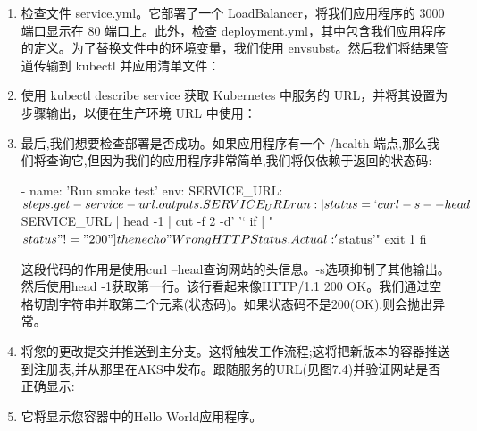 \begin{enumerate}
\item 
检查文件 service.yml。它部署了一个 LoadBalancer，将我们应用程序的 3000 端口显示在 80 端口上。此外，检查 deployment.yml，其中包含我们应用程序的定义。为了替换文件中的环境变量，我们使用 envsubst。然后我们将结果管道传输到 kubectl 并应用清单文件：


\item 
使用 kubectl describe service 获取 Kubernetes 中服务的 URL，并将其设置为步骤输出，以便在生产环境 URL 中使用：


\item 
最后,我们想要检查部署是否成功。如果应用程序有一个 /health 端点,那么我们将查询它,但因为我们的应用程序非常简单,我们将仅依赖于返回的状态码:

\begin{shell}
- name: 'Run smoke test'
  env:
    SERVICE_URL: ${{ steps.get-service-url.outputs.SERVICE_URL}}
  run: |
   status=`curl -s --head $SERVICE_URL | head -1 | cut -f 2 -d' '`
  if [ "$status" != "200" ]
  then
    echo "Wrong HTTP Status. Actual: '$status'"
    exit 1
  fi
\end{shell}

这段代码的作用是使用curl --head查询网站的头信息。-s选项抑制了其他输出。然后使用head -1获取第一行。该行看起来像HTTP/1.1 200 OK。我们通过空格切割字符串并取第二个元素(状态码)。如果状态码不是200(OK),则会抛出异常。

\item 
将您的更改提交并推送到主分支。这将触发工作流程;这将把新版本的容器推送到注册表,并从那里在AKS中发布。跟随服务的URL(见图7.4)并验证网站是否正确显示:


\item 
它将显示您容器中的Hello World应用程序。
\end{enumerate}


